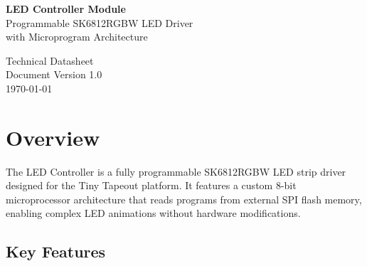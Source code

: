 \documentclass[11pt,a4paper]{article}
\begin{document}
\begin{titlepage}
    \centering
    \vspace*{2cm}
    {\Huge\bfseries\color{headerblue} LED Controller Module\\[0.5cm]}
    {\Large Programmable SK6812RGBW LED Driver\\[0.3cm]}
    {\large with Microprogram Architecture\\[2cm]}


    \vfill
    {\large Technical Datasheet\\[0.5cm]}
    {\normalsize Document Version 1.0\\}
    {\normalsize\today}
\end{titlepage}

\tableofcontents
\newpage

\section{Overview}

The LED Controller is a fully programmable SK6812RGBW LED strip driver designed for the Tiny Tapeout platform. It features a custom 8-bit microprocessor architecture that reads programs from external SPI flash memory, enabling complex LED animations without hardware modifications.

\subsection{Key Features}
\end{document}
